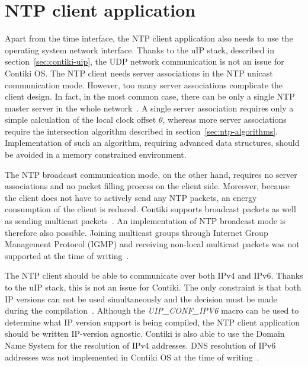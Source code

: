 
\section{NTP client application}\label{sec:analysis-application}
Apart from the time interface, the NTP client application
also needs to use the operating system network interface.
Thanks to the uIP stack, described in section~\ref{sec:contiki-uip},
the UDP network communication is not an issue for Contiki OS.
The NTP client needs server associations in the NTP unicast communication mode.
However, too many server associations complicate the client design.
In fact, in the most common case, there can be only a single NTP master server
in the whole network~\cite{rfc5905}.
A single server association requires only a simple calculation of the local clock offset
$\theta$, whereas more server associations require the intersection algorithm
described in section~\ref{sec:ntp-algorithms}.
Implementation of such an algorithm, requiring advanced data structures, should be avoided
in a memory constrained environment.

The NTP broadcast communication mode, on the other hand,
requires no server associations and no packet filling process on the client side.
Moreover, because the client does not have to actively send any NTP packets,
an energy consumption of the client is reduced.
Contiki supports broadcast packets as well as sending multicast packets~\cite{contiki-docs}.
An implementation of NTP broadcast mode is therefore also possible.
Joining multicast groups through Internet Group Management Protocol (IGMP)
and receiving non-local multicast packets
was not supported at the time of writing~\cite{contiki-docs}.

The NTP client should be able to communicate over both IPv4 and IPv6.
Thanks to the uIP stack, this is not an issue for Contiki.
The only constraint is that both IP versions can not be used simultaneously
and the decision must be made during the compilation~\cite{contiki-docs}.
Although the {\it{UIP\_CONF\_IPV6}} macro can be used to determine what IP version
support is being compiled, the NTP client application should be written IP-version agnostic.
Contiki is also able to use the Domain Name System for the resolution of IPv4 addresses.
DNS resolution of IPv6 addresses was not implemented in Contiki OS
at the time of writing~\cite{contiki-docs}.


